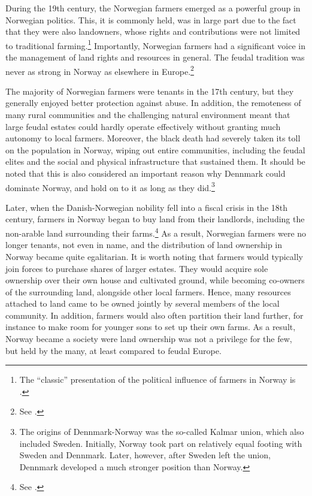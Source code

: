 During the 19th century, the Norwegian farmers emerged as a powerful group in Norwegian politics. This, it is commonly held, was in large part due to the fact that they were also landowners, whose rights and contributions were not limited to traditional farming.\footnote{The ``classic'' presentation of the political influence of farmers in Norway is \cite{koht26}.} Importantly, Norwegian farmers had a significant voice in the management of land rights and resources in general. The feudal tradition was never as strong in Norway as elsewhere in Europe.\footnote{See \cite[59-60]{pryser99}.}

The majority of Norwegian farmers were tenants in the 17th century, but they generally enjoyed better protection against abuse. In addition, the remoteness of many rural communities and the challenging natural environment meant that large feudal estates could hardly operate effectively without granting much autonomy to local farmers. Moreover, the black death had severely taken its toll on the population in Norway, wiping out entire communities, including the feudal elites and the social and physical infrastructure that sustained them. It should be noted that this is also considered an important reason why Dennmark could dominate Norway, and hold on to it as long as they did.\footnote{The origins of Dennmark-Norway was the so-called Kalmar union, which also included Sweden. Initially, Norway took part on relatively equal footing with Sweden and Dennmark. Later, however, after Sweden left the union, Dennmark developed a much stronger position than Norway.}

Later, when the Danish-Norwegian nobility fell into a fiscal crisis in the 18th century, farmers in Norway began to buy land from their landlords, including the non-arable land surrounding their farms.\footnote{See \cite[59-60]{pryser99}.} As a result, Norwegian farmers were no longer tenants, not even in name, and the distribution of land ownership in Norway became quite egalitarian. It is worth noting that farmers would typically join forces to purchase shares of larger estates. They would acquire sole ownership over their own house and cultivated ground, while becoming co-owners of the surrounding land, alongside other local farmers. Hence, many resources attached to land came to be owned jointly by several members of the local community. In addition, farmers would also often partition their land further, for instance to make room for younger sons to set up their own farms. As a result, Norway became a society were land ownership was not a privilege for the few, but held by the many, at least compared to feudal Europe.

